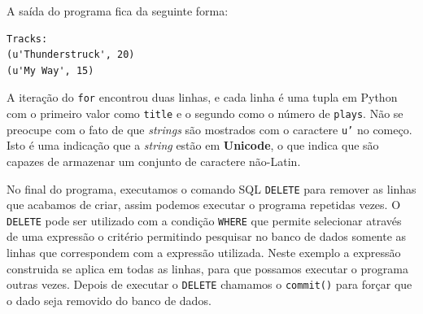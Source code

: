 
A saída do programa fica da seguinte forma:

\beforeverb
\begin{verbatim}
Tracks:
(u'Thunderstruck', 20)
(u'My Way', 15)
\end{verbatim}
\afterverb
%

A iteração do {\tt for} encontrou duas linhas, e cada linha é uma tupla em
Python com o primeiro valor como {\tt title} e o segundo como o número de
{\tt plays}. Não se preocupe com o fato de que {\it strings} são mostrados com
o caractere {\tt u'} no começo. Isto é uma indicação que a {\it string} estão
em {\bf Unicode}, o que indica que são capazes de armazenar um conjunto de
caractere não-Latin.


No final do programa, executamos o comando SQL {\tt DELETE} para remover as
linhas que acabamos de criar, assim podemos executar o programa repetidas
vezes. O {\tt DELETE} pode ser utilizado com a condição {\tt WHERE} que permite
selecionar através de uma expressão o critério permitindo pesquisar no banco
de dados somente as linhas que correspondem com a expressão utilizada. Neste
exemplo a expressão construida se aplica em todas as linhas, para que possamos
executar o programa outras vezes. Depois de executar o {\tt DELETE} chamamos o
{\tt commit()} para forçar que o dado seja removido do banco de dados.

